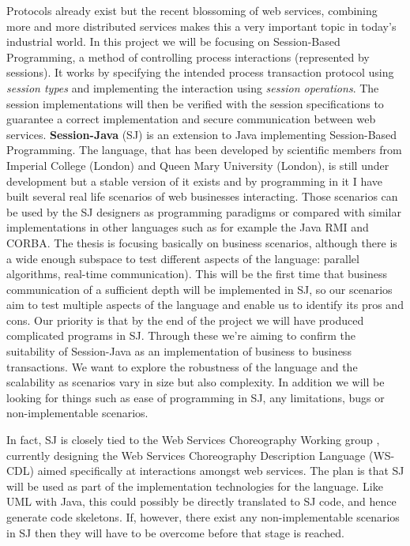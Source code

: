 Protocols already exist but the recent blossoming of web services, combining more and more distributed services makes this a very important topic in today's industrial world. In this project we will be focusing on Session-Based Programming, a method of controlling process interactions (represented by sessions). It works by specifying the intended process transaction protocol using \textit{session types} and implementing the interaction using \textit{session operations}. The session implementations will then be verified with the session specifications to guarantee a correct implementation and secure communication between web services. \textbf{Session-Java} (SJ) is an extension to Java implementing Session-Based Programming. The language, that has been developed by scientific members from Imperial College (London) and Queen Mary University (London), is still under development but a stable version of it exists and by programming in it I have built several real life scenarios of web businesses interacting. Those scenarios can be used by the SJ designers as programming paradigms or compared with similar implementations in other languages such as for example the Java RMI and CORBA. The thesis is focusing basically on business scenarios, although there is a wide enough subspace to test different aspects of the language: parallel algorithms, real-time communication). This will be the first time that business communication of a sufficient depth will be implemented in SJ, so our scenarios aim to test multiple aspects of the language and enable us to identify its pros and cons. Our priority is that by the end of the project we will have produced complicated programs in SJ. Through these we're aiming to confirm the suitability of Session-Java as an implementation of business to business transactions. We want to explore the robustness of the language and the scalability as scenarios vary in size but also complexity. In addition we will be looking for things such as ease of programming in SJ, any limitations, bugs or non-implementable scenarios.

In fact, SJ is closely tied to the Web Services Choreography Working group \cite{comseqpro}, currently designing the Web Services Choreography Description Language (WS-CDL) aimed specifically at interactions amongst web services. The plan is that SJ will be used as part of the implementation technologies for the language. Like UML with Java, this could possibly be directly translated to SJ code, and hence generate code skeletons. If, however, there exist any non-implementable scenarios in SJ then they will have to be overcome before that stage is reached.

